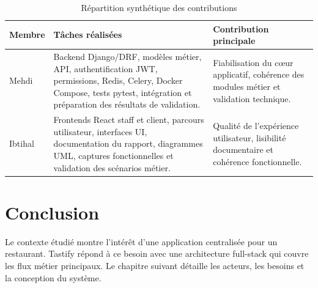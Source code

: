 \begin{table}[H]
\centering
\caption{Répartition synthétique des contributions}
\label{tab:repartition-travail}
\begin{tabularx}{\textwidth}{p{2.7cm}YY}
\toprule
\textbf{Membre} & \textbf{Tâches réalisées} & \textbf{Contribution principale} \\
\midrule
Mehdi & Backend Django/DRF, modèles métier, API, authentification JWT, permissions, Redis, Celery, Docker Compose, tests pytest, intégration et préparation des résultats de validation. & Fiabilisation du cœur applicatif, cohérence des modules métier et validation technique. \\
Ibtihal & Frontends React staff et client, parcours utilisateur, interfaces UI, documentation du rapport, diagrammes UML, captures fonctionnelles et validation des scénarios métier. & Qualité de l'expérience utilisateur, lisibilité documentaire et cohérence fonctionnelle. \\
\bottomrule
\end{tabularx}
\end{table}

\section*{Conclusion}
Le contexte étudié montre l'intérêt d'une application centralisée pour un restaurant. Tastify répond à ce besoin avec une architecture full-stack qui couvre les flux métier principaux. Le chapitre suivant détaille les acteurs, les besoins et la conception du système.
